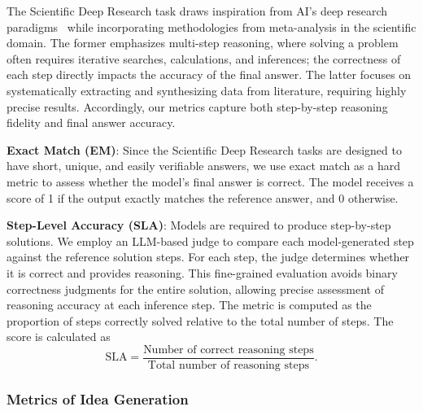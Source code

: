 The Scientific Deep Research task draws inspiration from AI's deep research paradigms~\cite{wenxiaobai,DeepResearch_OpenAI2025,Perplexity_DeepResearch_2025,KimiResearcher_2025,GrokDeepSearch_2025} while incorporating methodologies from meta-analysis in the scientific domain. The former emphasizes multi-step reasoning, where solving a problem often requires iterative searches, calculations, and inferences; the correctness of each step directly impacts the accuracy of the final answer. The latter focuses on systematically extracting and synthesizing data from literature, requiring highly precise results. Accordingly, our metrics capture both step-by-step reasoning fidelity and final answer accuracy.

\begin{tcolorbox}[
    breakable,
    title=Metric Definition of Exact Match,
    colback=LighterGray,
    colframe=DeepPurple,
    colbacktitle=DeepPurple,
    coltitle=White
]
\textbf{Exact Match (EM)}: Since the Scientific Deep Research tasks are designed to have short, unique, and easily verifiable answers, we use exact match as a hard metric to assess whether the model's final answer is correct. The model receives a score of 1 if the output exactly matches the reference answer, and 0 otherwise.
\end{tcolorbox}

\begin{tcolorbox}[
    breakable,
    title=Metric Definition of Step-Level Accuracy,
    colback=LighterGray,
    colframe=DeepPurple,
    colbacktitle=DeepPurple,
    coltitle=White
]
\textbf{Step-Level Accuracy (SLA)}: Models are required to produce step-by-step solutions. We employ an LLM-based judge to compare each model-generated step against the reference solution steps. For each step, the judge determines whether it is correct and provides reasoning. This fine-grained evaluation avoids binary correctness judgments for the entire solution, allowing precise assessment of reasoning accuracy at each inference step. The metric is computed as the proportion of steps correctly solved relative to the total number of steps. The score is calculated as
\[
\text{SLA} = \frac{\text{Number of correct reasoning steps}}{\text{Total number of reasoning steps}}.
\]

\end{tcolorbox}



\subsubsection{Metrics of Idea Generation}
\label{Metrics: Idea Gen}

